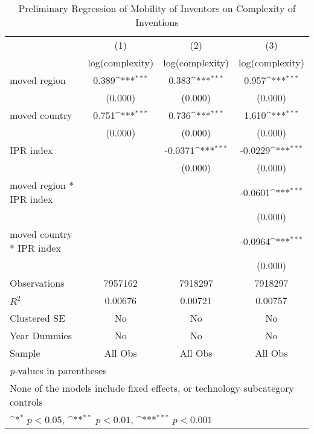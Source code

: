 {
\def\sym#1{\ifmmode^{#1}\else\(^{#1}\)\fi}
\begin{longtable}{l*{3}{c}}
\caption{Preliminary Regression of Mobility of Inventors on Complexity of Inventions \label{model1a1b1c}}\\
\hline\hline\endfirsthead\hline\endhead\hline\endfoot\endlastfoot
                &\multicolumn{1}{c}{(1)}&\multicolumn{1}{c}{(2)}&\multicolumn{1}{c}{(3)}\\
                &\multicolumn{1}{c}{log(complexity)}&\multicolumn{1}{c}{log(complexity)}&\multicolumn{1}{c}{log(complexity)}\\
\hline
moved region    &    0.389\sym{***}&    0.383\sym{***}&    0.957\sym{***}\\
                &  (0.000)         &  (0.000)         &  (0.000)         \\
moved country   &    0.751\sym{***}&    0.736\sym{***}&    1.610\sym{***}\\
                &  (0.000)         &  (0.000)         &  (0.000)         \\
IPR index       &                  &  -0.0371\sym{***}&  -0.0229\sym{***}\\
                &                  &  (0.000)         &  (0.000)         \\
moved region * IPR index&                  &                  &  -0.0601\sym{***}\\
                &                  &                  &  (0.000)         \\
moved country * IPR index&                  &                  &  -0.0964\sym{***}\\
                &                  &                  &  (0.000)         \\
\hline
Observations    &  7957162         &  7918297         &  7918297         \\
$R^2$              &  0.00676         &  0.00721         &  0.00757         \\
Clustered SE              &       No         &       No         &       No         \\
Year Dummies            &       No         &       No         &       No         \\
Sample          &  All Obs         &  All Obs         &  All Obs         \\
\hline\hline
\multicolumn{4}{l}{\footnotesize \textit{p}-values in parentheses}\\
\multicolumn{4}{l}{\footnotesize None of the models include fixed effects, or technology subcategory controls}\\
\multicolumn{4}{l}{\footnotesize \sym{*} \(p<0.05\), \sym{**} \(p<0.01\), \sym{***} \(p<0.001\)}\\
\end{longtable}
}

